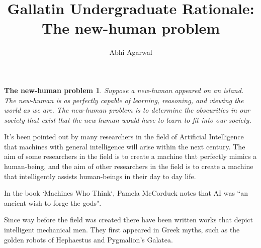 \documentclass[12pt]{article}
\title{Gallatin Undergraduate Rationale: The new-human problem}
\author{Abhi Agarwal}
\date{}
\newtheorem*{nhp-definition}{The new-human problem}
\begin{document}
\maketitle

\begin{nhp-definition}
Suppose a new-human appeared on an island. The new-human is as perfectly capable of learning, reasoning, and viewing the world as we are. The new-human problem is to determine the obscurities in our society that exist that the new-human would have to learn to fit into our society.
\end{nhp-definition}

\par It's been pointed out by many researchers in the field of Artificial Intelligence that machines with general intelligence will arise within the next century. The aim of some researchers in the field is to create a machine that perfectly mimics a human-being, and the aim of other researchers in the field is to create a machine that intelligently assists human-beings in their day to day life.

\par In the book `Machines Who Think`, Pamela McCorduck notes that AI was ``an ancient wish to forge the gods".

\par Since way before the field was created there have been written works that depict intelligent mechanical men. They first appeared in Greek myths, such as the golden robots of Hephaestus and Pygmalion's Galatea. 

\par 

% 
\end{document}
